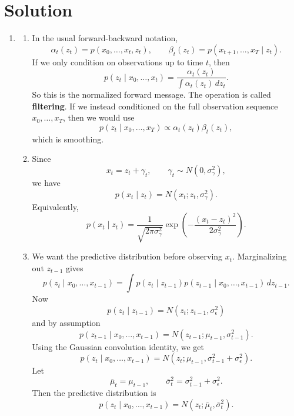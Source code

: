 \documentclass[submit]{harvardml}
\newcommand{\sigeps}{\sigma_{\epsilon}}
\newcommand{\siggam}{\sigma_{\gamma}}
\newenvironment{solution}
  {\color{blue}\section*{Solution}}
{}
\begin{document}
\begin{solution}
	\begin{enumerate}
    \item
    \begin{enumerate}
        \item In the usual forward-backward notation,
        \[
        \alpha_t(z_t)=p(x_0,\ldots,x_t,z_t), \qquad
        \beta_t(z_t)=p(x_{t+1},\ldots,x_T\mid z_t).
        \]
        If we only condition on observations up to time $t$, then
        \[
        p(z_t\mid x_0,\ldots,x_t)
        = \frac{\alpha_t(z_t)}{\int \alpha_t(z_t)\,dz_t}.
        \]
        So this is the normalized forward message. The operation is called \textbf{filtering}. If we instead conditioned on the full observation sequence $x_0,\ldots,x_T$, then we would use
        \[
        p(z_t\mid x_0,\ldots,x_T) \propto \alpha_t(z_t)\beta_t(z_t),
        \]
        which is smoothing.

        \item Since
        \[
        x_t=z_t+\gamma_t, \qquad \gamma_t\sim N(0,\siggam^2),
        \]
        we have
        \[
        p(x_t\mid z_t)=N(x_t;z_t,\siggam^2).
        \]
        Equivalently,
        \[
        p(x_t\mid z_t)
        =\frac{1}{\sqrt{2\pi\siggam^2}}
        \exp\left(-\frac{(x_t-z_t)^2}{2\siggam^2}\right).
        \]

        \item We want the predictive distribution before observing $x_t$. Marginalizing out $z_{t-1}$ gives
        \[
        p(z_t\mid x_0,\ldots,x_{t-1})
        =\int p(z_t\mid z_{t-1})p(z_{t-1}\mid x_0,\ldots,x_{t-1})\,dz_{t-1}.
        \]
        Now
        \[
        p(z_t\mid z_{t-1})=N(z_t;z_{t-1},\sigeps^2)
        \]
        and by assumption
        \[
        p(z_{t-1}\mid x_0,\ldots,x_{t-1})=N(z_{t-1};\mu_{t-1},\sigma_{t-1}^2).
        \]
        Using the Gaussian convolution identity, we get
        \[
        p(z_t\mid x_0,\ldots,x_{t-1})
        =N(z_t;\mu_{t-1},\sigma_{t-1}^2+\sigeps^2).
        \]
        Let
        \[
        \bar{\mu}_t=\mu_{t-1}, \qquad \bar{\sigma}_t^2=\sigma_{t-1}^2+\sigeps^2.
        \]
        Then the predictive distribution is
        \[
        p(z_t\mid x_0,\ldots,x_{t-1})=N(z_t;\bar{\mu}_t,\bar{\sigma}_t^2).
        \]


\end{enumerate}
\end{enumerate}
\end{solution}
\end{document}
